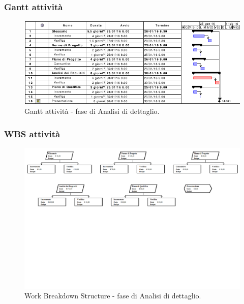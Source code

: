 \documentclass[a4paper]{article}
\begin{document}
			\subsubsection{Gantt attività}
				\begin{figure}[H]
					\centering
					\includegraphics[scale=0.5]{gantt_dettaglio}
					\caption{Gantt attività - fase di Analisi di dettaglio.}
				\end{figure}
			\subsubsection{WBS attività}
				\begin{figure}[H]
					\centering
					\includegraphics[scale=0.5]{wbs_dettaglio}
					\caption{Work Breakdown Structure - fase di Analisi di dettaglio.}
				\end{figure}
\end{document}
